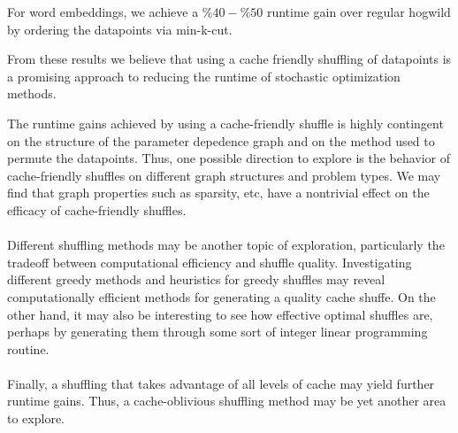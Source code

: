 \documentclass[times,11pt]{article}
\numberwithin{equation}{section}		%
\numberwithin{figure}{section}			%
\numberwithin{table}{section}				%
\begin{document}

For word embeddings, we achieve a $\%40-\%50$ runtime gain over regular hogwild by ordering the datapoints via min-k-cut.

From these results we believe that using a cache friendly shuffling of datapoints is a promising approach to reducing the runtime of stochastic optimization methods.

The runtime gains achieved by using a cache-friendly shuffle is highly
contingent on the structure of the parameter depedence graph and on
the method used to permute the datapoints. Thus, one possible
direction to explore is the behavior of cache-friendly shuffles on
different graph structures and problem types. We may find that graph
properties such as sparsity, etc, have a nontrivial effect on the
efficacy of cache-friendly shuffles.
\\\\
Different shuffling methods may be another topic of exploration, particularly
the tradeoff between computational efficiency and shuffle
quality. Investigating different greedy methods and heuristics for
greedy shuffles may reveal computationally efficient methods for
generating a quality cache shuffe. On the other hand, it may also be
interesting to see how effective optimal shuffles are, perhaps by
generating them through some sort of integer linear programming
routine.
\\\\
Finally, a shuffling that takes advantage of all levels of cache may yield further runtime gains.
Thus, a cache-oblivious shuffling method may be yet another area to explore.






\end{document}
